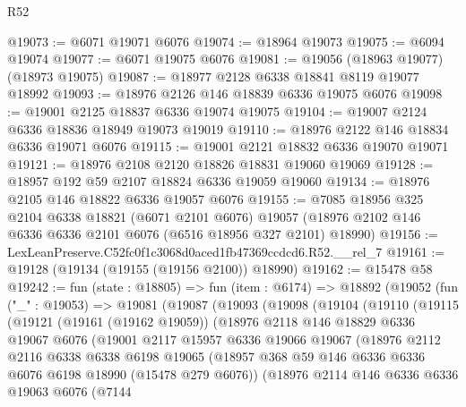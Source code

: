 \begin{lexlean}{R52}
\begin{coremodule}
@19073 := @6071 @19071 @6076
@19074 := @18964 @19073
@19075 := @6094 @19074
@19077 := @6071 @19075 @6076
@19081 := @19056 (@18963 @19077) (@18973 @19075)
@19087 := @18977 @2128 @6338 @18841 @8119 @19077 @18992
@19093 := @18976 @2126 @146 @18839 @6336 @19075 @6076
@19098 := @19001 @2125 @18837 @6336 @19074 @19075
@19104 := @19007 @2124 @6336 @18836 @18949 @19073 @19019
@19110 := @18976 @2122 @146 @18834 @6336 @19071 @6076
@19115 := @19001 @2121 @18832 @6336 @19070 @19071
@19121 := @18976 @2108 @2120 @18826 @18831 @19060 @19069
@19128 := @18957 @192 @59 @2107 @18824 @6336 @19059 @19060
@19134 := @18976 @2105 @146 @18822 @6336 @19057 @6076
@19155 := @7085
    @18956
    @325
    @2104
    @6338
    @18821
    (@6071 @2101 @6076)
    @19057
    (@18976 @2102 @146 @6336 @6336 @2101 @6076 (@6516 @18956 @327 @2101) @18990)
@19156 := LexLeanPreserve.C52fc0f1c3068d0aced1fb47369ccdcd6.R52.__rel_7
@19161 := @19128 (@19134 (@19155 (@19156 @2100)) @18990)
@19162 := @15478 @58
@19242 := fun (state : @18805) =>
  fun (item : @6174) =>
  @18892
    (@19052
      (fun ("_" : @19053) =>
      @19081
        (@19087
          (@19093
            (@19098
              (@19104
                (@19110
                  (@19115
                    (@19121
                      (@19161 (@19162 @19059))
                      (@18976
                        @2118
                        @146
                        @18829
                        @6336
                        @19067
                        @6076
                        (@19001
                          @2117
                          @15957
                          @6336
                          @19066
                          @19067
                          (@18976
                            @2112
                            @2116
                            @6338
                            @6338
                            @6198
                            @19065
                            (@18957
                              @368
                              @59
                              @146
                              @6336
                              @6336
                              @6076
                              @6198
                              @18990
                              (@15478 @279 @6076))
                            (@18976
                              @2114
                              @146
                              @6336
                              @6336
                              @19063
                              @6076
                              (@7144

\end{coremodule}
\end{lexlean}
